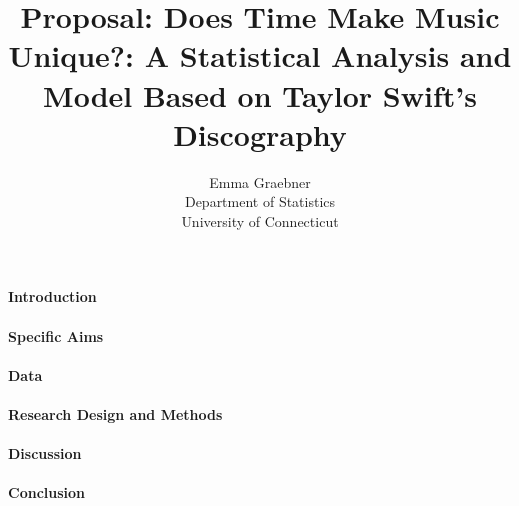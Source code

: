 \documentclass[12pt]{article}
\title{Proposal: Does Time Make Music Unique?: A Statistical Analysis and Model Based on Taylor Swift's Discography}
\author{Emma Graebner\\
  Department of Statistics\\
  University of Connecticut
}
\begin{document}
\maketitle


\paragraph{Introduction}

\citep{sloan2021taylor}
\citep{fogarty2021you} 
\citep{perone2017words}

\paragraph{Specific Aims}


\paragraph{Data}


\paragraph{Research Design and Methods}


\paragraph{Discussion}


\paragraph{Conclusion}




\end{document}
